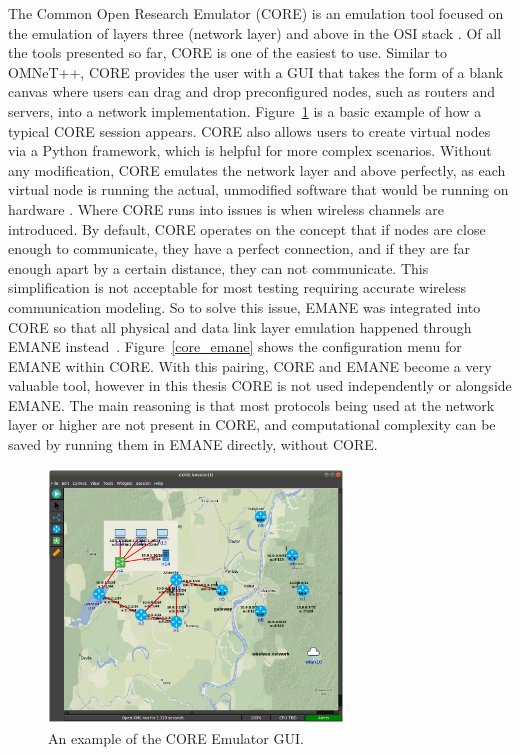 The Common Open Research Emulator (CORE) is an emulation tool focused on the emulation of layers three (network layer) and above in the OSI stack \cite{core}.
Of all the tools presented so far, CORE is one of the easiest to use.
Similar to OMNeT++, CORE provides the user with a GUI that takes the form of a blank canvas where users can drag and drop preconfigured nodes, such as routers and servers, into a network implementation.
Figure~\ref{core_gui} is a basic example of how a typical CORE session appears.
CORE also allows users to create virtual nodes via a Python framework, which is helpful for more complex scenarios.
Without any modification, CORE emulates the network layer and above perfectly, as each virtual node is running the actual, unmodified software that would be running on hardware \cite{emane_core}.
Where CORE runs into issues is when wireless channels are introduced.
By default, CORE operates on the concept that if nodes are close enough to communicate, they have a perfect connection, and if they are far enough apart by a certain distance, they can not communicate.
This simplification is not acceptable for most testing requiring accurate wireless communication modeling. So to solve this issue, EMANE was integrated into CORE so that all physical and data link layer emulation happened through EMANE instead~\cite{emane_core}.
Figure~\ref{core_emane} shows the configuration menu for EMANE within CORE.
With this pairing, CORE and EMANE become a very valuable tool, however in this thesis CORE is not used independently or alongside EMANE.
The main reasoning is that most protocols being used at the network layer or higher are not present in CORE, and computational complexity can be saved by running them in EMANE directly, without CORE.\par

\begin{figure}[!ht]
    \centering
    \includegraphics[width=0.7\textwidth,keepaspectratio]{Images/Chpt2/core_gui.png}
    \caption{An example of the CORE Emulator GUI.}
    \label{core_gui}
\end{figure}

